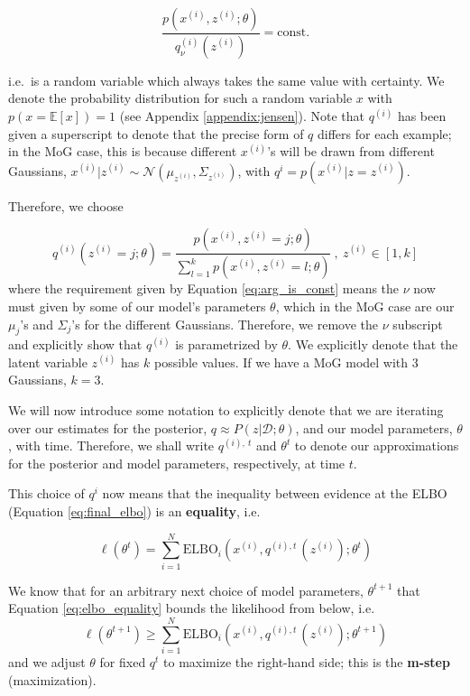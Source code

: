 \documentclass[]{article}
\begin{document}
\begin{equation}\label{eq:arg_is_const}
    \frac{p(x^{(i)}, z^{(i)};\theta)}{q_\nu^{(i)}(z^{(i)})} = \text{const.}
\end{equation}

i.e.\ is a random variable which always takes the same value with certainty. We denote the probability distribution for such a random variable $x$ with $p(x=\mathbb{E}[x]) = 1$ (see Appendix \ref{appendix:jensen}). Note that $q^{(i)}$ has been given a superscript to denote that the precise form of $q$ differs for each example; in the MoG case, this is because different $x^{(i)}$'s will be drawn from different Gaussians, $x^{(i)}|z^{(i)} \sim \mathcal{N}({\mu_{z^{(i)}}}, \Sigma_{z^{(i)}})$, with $q^i = p(x^{(i)}|z = z^{(i)})$.

Therefore, we choose

\begin{equation}\label{eq:q_choice}
    q^{(i)}(z^{(i)}=j; \theta)= \frac{p(x^{(i)}, z^{(i)}=j ;\theta)}{\sum_{l=1}^k p(x^{(i)}, z^{(i)}=l;\theta)}~, ~z^{(i)} \in [1, k]
\end{equation}
where the requirement given by Equation \ref{eq:arg_is_const} means the $\nu$ now must given by some of our model's parameters $\theta$, which in the MoG case are our $\mu_j$'s and $\Sigma_j$'s for the different Gaussians. Therefore, we remove the $\nu$ subscript and explicitly show that $q^{(i)}$ is parametrized by $\theta$. We explicitly denote that the latent variable $z^{(i)}$ has $k$ possible values. If we have a MoG model with 3 Gaussians, $k=3$.

We will now introduce some notation to explicitly denote that we are iterating over our estimates for the posterior, $q \approx P(z|\mathcal{D} ;\theta)$, and our model parameters, $\theta$, with time. Therefore, we shall write $q^{(i), ~t}$ and $\theta^{t}$ to denote our approximations for the posterior and model parameters, respectively, at time $t$.

This choice of $q^i$ now means that the inequality between evidence at the ELBO (Equation \ref{eq:final_elbo}) is an \textbf{equality}, i.e.

\begin{equation}\label{eq:elbo_equality}
    \ell(\theta^{t}) = \sum_{i=1}^N \text{ELBO}_i(x^{(i)}, q^{(i),t~}(z^{(i)});\theta^t)
\end{equation}

We know that for an arbitrary next choice of model parameters, $\theta^{t+1}$ that Equation \ref{eq:elbo_equality} bounds the likelihood from below, i.e.
\begin{equation}\label{eq:maximize}
    \ell(\theta^{t+1}) \geq \sum_{i=1}^N \text{ELBO}_i(x^{(i)}, q^{(i), t~}(z^{(i)});\theta^{t+1})    
\end{equation}
and we adjust $\theta$ for fixed $q^t$ to maximize the right-hand side; this is the \textbf{m-step} (maximization).
\end{document}
